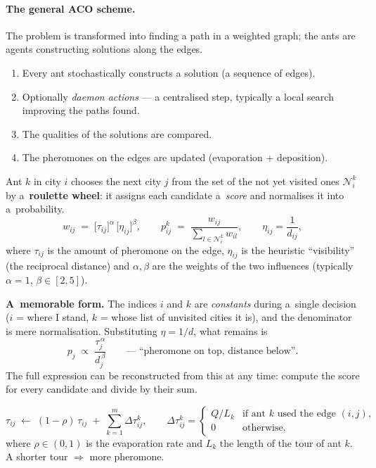 \documentclass[11pt,a4paper]{article}
\theoremstyle{definition}
\providecommand{\uv}[1]{``#1''}
\begin{document}
\paragraph{The general ACO scheme.} The problem is transformed into finding a
path in a weighted graph; the ants are agents constructing solutions along the
edges.
\begin{enumerate}
\item Every ant stochastically constructs a solution (a sequence of edges).
\item Optionally \emph{daemon actions} --- a centralised step, typically a local
  search improving the paths found.
\item The qualities of the solutions are compared.
\item The pheromones on the edges are updated (evaporation + deposition).
\end{enumerate}

\begin{defbox}
Ant $k$ in city $i$ chooses the next city $j$ from the set of the not yet
visited ones $\mathcal{N}_i^k$ by a~\textbf{roulette wheel}: it assigns each
candidate a~\emph{score} and normalises it into a~probability.
\[
w_{ij} \;=\; \big[\tau_{ij}\big]^{\alpha}\,\big[\eta_{ij}\big]^{\beta},
\qquad
p_{ij}^{k} \;=\; \frac{w_{ij}}{\displaystyle\sum_{l \in \mathcal{N}_i^k} w_{il}},
\qquad \eta_{ij} = \frac{1}{d_{ij}},
\]
where $\tau_{ij}$ is the amount of pheromone on the edge, $\eta_{ij}$ is the
heuristic \uv{visibility} (the reciprocal distance) and $\alpha, \beta$ are the
weights of the two influences (typically $\alpha = 1$, $\beta \in [2,5]$).

\textbf{A~memorable form.} The indices $i$ and $k$ are \emph{constants} during
a~single decision ($i$ = where I stand, $k$ = whose list of unvisited cities it
is), and the denominator is mere normalisation. Substituting $\eta = 1/d$, what
remains is
\[
p_j \;\propto\; \frac{\tau_j^{\,\alpha}}{d_j^{\,\beta}}
\qquad\text{---\ \uv{pheromone on top, distance below}.}
\]
The full expression can be reconstructed from this at any time: compute the score
for every candidate and divide by their sum.
\end{defbox}

\begin{defbox}
\[
\tau_{ij} \;\gets\; (1-\rho)\,\tau_{ij} \;+\; \sum_{k=1}^{m} \Delta\tau_{ij}^{k},
\qquad
\Delta\tau_{ij}^{k} =
\begin{cases}
Q/L_k & \text{if ant } k \text{ used the edge } (i,j),\\
0 & \text{otherwise,}
\end{cases}
\]
where $\rho \in (0,1)$ is the evaporation rate and $L_k$ the length of the tour
of ant $k$. A shorter tour $\Rightarrow$ more pheromone.
\end{defbox}
\end{document}
